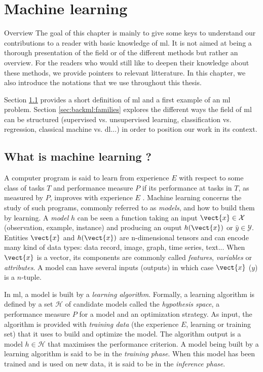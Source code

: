 \chapter{Machine learning}
\label{chap:backml}

\begin{overview}{Overview}
The goal of this chapter is mainly to give some keys to understand our contributions to a reader with basic knowledge of \acrlong{ml}. It is not aimed at being a thorough presentation of the field or of the different methods but rather an overview. For the readers who would still like to deepen their knowledge about these methods, we provide pointers to relevant litterature. In this chapter, we also introduce the notations that we use throughout this thesis.

Section \ref{sec:backml:whatisml} provides a short definition of \acrlong{ml} and a first example of an \acrshort{ml} problem. Section \ref{sec:backml:families} explores the different ways the field of \acrlong{ml} can be structured (\eg supervised vs. unsupervised learning, classification vs. regression, classical machine vs. \acrlong{dl}...) in order to position our work in its context.
\end{overview}

\section{What is machine learning ?}
\label{sec:backml:whatisml}

A computer program is said to learn from experience $E$ with respect to some class
of tasks $T$ and performance measure $P$ if its performance at tasks in $T$, as
measured by $P$, improves with experience $E$ \parencite{mitchell1997machine}.
Machine learning concerns the study of such programs, commonly referred to as
\textit{models}, and how to build them by learning. A \textit{model} $h$ can be
seen a function taking an input $\vect{x} \in \mathcal{X}$ (\aka observation,
example, instance) and producing an ouput $h(\vect{x})$ or $\hat{y} \in \mathcal{Y}$.
Entities $\vect{x}$ and $h(\vect{x})$ are n-dimensional tensors and can encode many
kind of data types: data record, image, graph, time series, text... When $\vect{x}$
is a vector, its components are commonly called \textit{features}, \textit{variables}
or \textit{attributes}. A model can have several inputs (\resp outputs) in which
case $\vect{x}$ (\resp $y$) is a $n$-tuple.

In \acrlong{ml}, a model is built by a \textit{learning algorithm}. Formally, a
learning algorithm is defined by a set $\mathcal{H}$ of candidate models called
the \textit{hypothesis space}, a performance measure $P$ for a model and an
optimization strategy. As input, the algorithm is provided with \textit{training data}
(the experience $E$, \aka learning or training set) that it uses to build and optimize
the model. The algorithm output is a model $h \in \mathcal{H}$ that
maximises the performance criterion. A model being built by a learning algorithm
is said to be in the \textit{training phase}. When this model has been trained
and is used on new data, it is said to be in the \textit{inference phase}.

